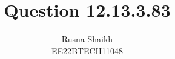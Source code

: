 \documentclass{article}[]
\begin{document}
\title{Question 12.13.3.83}
\author{Rusna Shaikh\\EE22BTECH11048}
\date{}
\maketitle{}
\providecommand{\pr}[1]{\ensuremath{\Pr\left(#1\right)}}
\providecommand{\prt}[2]{\ensuremath{p_{#1}^{\left(#2\right)} }}        %
\providecommand{\qfunc}[1]{\ensuremath{Q\left(#1\right)}}
\providecommand{\sbrak}[1]{\ensuremath{{}\left[#1\right]}}
\providecommand{\lsbrak}[1]{\ensuremath{{}\left[#1\right.}}
\providecommand{\rsbrak}[1]{\ensuremath{{}\left.#1\right]}}
\providecommand{\brak}[1]{\ensuremath{\left(#1\right)}}
\providecommand{\lbrak}[1]{\ensuremath{\left(#1\right.}}
\providecommand{\rbrak}[1]{\ensuremath{\left.#1\right)}}
\providecommand{\cbrak}[1]{\ensuremath{\left\{#1\right\}}}
\providecommand{\lcbrak}[1]{\ensuremath{\left\{#1\right.}}
\providecommand{\rcbrak}[1]{\ensuremath{\left.#1\right\}}}
\newcommand{\sgn}{\mathop{\mathrm{sgn}}}
\providecommand{\abs}[1]{\left\vert#1\right\vert}
\providecommand{\res}[1]{\Res\displaylimits_{#1}} 
\providecommand{\norm}[1]{\left\lVert#1\right\rVert}
\providecommand{\mtx}[1]{\mathbf{#1}}
\providecommand{\mean}[1]{E\left[ #1 \right]}
\providecommand{\cond}[2]{#1\middle|#2}
\providecommand{\fourier}{\overset{\mathcal{F}}{ \rightleftharpoons}}
\newenvironment{amatrix}[1]{%
  \left(\begin{array}{@{}*{#1}{c}|c@{}}
}{%
  \end{array}\right)
}
\newcommand{\solution}{\noindent \textbf{Solution: }}
\newcommand{\cosec}{\,\text{cosec}\,}
\providecommand{\dec}[2]{\ensuremath{\overset{#1}{\underset{#2}{\gtrless}}}}
\newcommand{\myvec}[1]{\ensuremath{\begin{pmatrix}#1\end{pmatrix}}}
\newcommand{\mydet}[1]{\ensuremath{\begin{vmatrix}#1\end{vmatrix}}}
\newcommand{\myaugvec}[2]{\ensuremath{\begin{amatrix}{#1}#2\end{amatrix}}}
\providecommand{\rank}{\text{rank}}
\providecommand{\pr}[1]{\ensuremath{\Pr\left(#1\right)}}
\providecommand{\qfunc}[1]{\ensuremath{Q\left(#1\right)}}
\end{document}
